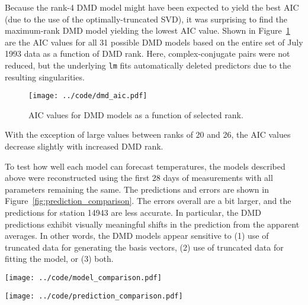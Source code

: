 \documentclass[review,number,sort&compress,12pt]{elsarticle}
\begin{document}
Because the rank-4 DMD model might have been expected to yield the best AIC (due to the use of the optimally-truncated SVD), it was surprising to find the maximum-rank DMD model yielding the lowest AIC value.  Shown in Figure~\ref{fig:dmd_aic} are the AIC values for all 31 possible DMD models based on the entire set of July 1993 data as a function of DMD rank.  Here, complex-conjugate pairs were not reduced, but the underlying {\tt lm} fits automatically deleted predictors due to the resulting singularities.
\begin{figure}[ht]
 \centering
 \texttt{[image: ../code/dmd\_aic.pdf]}\\
   \caption{AIC values for DMD models as a function of selected rank.}
  \label{fig:dmd_aic}
\end{figure}
With the exception of large values between ranks of 20 and 26, the AIC values decrease slightly with increased DMD rank. 


To test how well each model can forecast temperatures, the models described above were reconstructed using the first 28 days of measurements with all parameters remaining the same.  
The predictions and errors are shown in Figure~\ref{fig:prediction_comparison}.
The errors overall are a bit larger, and the predictions for station 14943 are less accurate.
In particular, the DMD predictions exhibit visually meaningful shifts in the prediction from the apparent averages.
In other words, the DMD models appear sensitive to (1) use of truncated data for generating the basis vectors, (2) use of truncated data for fitting the model, or (3) both.

\begin{figure*}[h]
 \centering
 \texttt{[image: ../code/model\_comparison.pdf]}\\
   \caption{Predicted temperatures at all space-time points (left) with corresponding errors (center). Also shown are measured values with predictions and 95\% prediction intervals at station 14943.}
  \label{fig:model_comparison}
\end{figure*}

\begin{figure*}[h]
 \centering
 \texttt{[image: ../code/prediction\_comparison.pdf]}\\
   \caption{Same as Figure~\ref{fig:model_comparison} but each model was constructed using only the first 28 days of measurements.}
  \label{fig:prediction_comparison}
\end{figure*}
\end{document}
